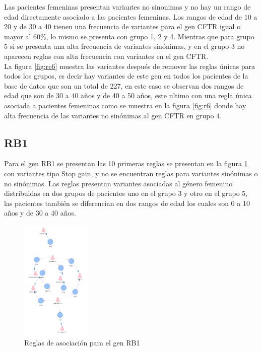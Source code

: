 Las pacientes femeninas presentan variantes no sinonimas y no hay un  rango de edad directamente asociado a las pacientes femeninas. Los rangos de edad de 10 a 20 y de 30 a 40 tienen una frecuencia de variantes para el gen CFTR igual o mayor al 60\%, lo mismo se presenta con grupo 1, 2 y 4. Mientras que para grupo 5 si se presenta una alta frecuencia de variantes sinónimas, y en el grupo 3 no aparecen reglas con alta frecuencia con variantes en el gen CFTR. \\

La figura \ref{fig:re6} muestra las variantes después de remover las  reglas únicas para todos los grupos, es decir hay variantes de este gen en todos los pacientes de la base de datos que son un total de 227, en este caso se observan dos rangos de edad que son de 30 a 40 años y de 40 a 50 años, este ultimo con una regla única asociada a pacientes femeninas como se muestra en la figura \ref{fig:r6} donde hay alta frecuencia de las variantes no sinónimas al gen CFTR en grupo 4.  

\subsection*{RB1}

Para el gen RB1 se presentan las 10 primeras reglas se presentan en la figura \ref{fig:re7} con variantes tipo Stop gain, y no se encuentran reglas para variantes sinónimas o no sinónimas. Las reglas presentan variantes asociadas al género femenino distribuidas en dos grupos de pacientes uno en el grupo 3 y otro en el grupo 5, las pacientes también se diferencian en dos rangos de edad los cuales son 0 a 10 años y de 30 a 40 años. 

\begin{figure}[h]
	\centering
	\includegraphics[width=0.3\textwidth]{Kap4/RB1}
	\caption{Reglas de asociación para el gen RB1} \label{fig:re7}
\end{figure}

